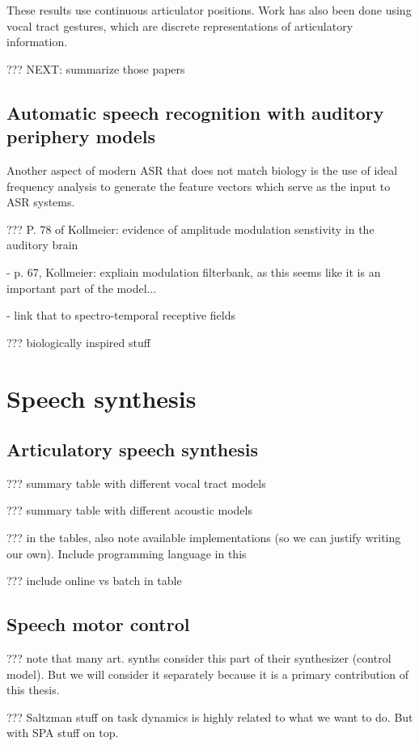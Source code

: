 These results
use continuous articulator positions.
Work has also been done using
vocal tract gestures,
which are discrete representations
of articulatory information.

??? NEXT: summarize those papers

\subsection{Automatic speech recognition with auditory periphery models}

Another aspect of modern ASR
that does not match biology
is the use of ideal frequency analysis
to generate the feature vectors
which serve as the input to ASR systems.

??? P. 78 of Kollmeier: evidence of amplitude modulation senstivity
in the auditory brain

- p. 67, Kollmeier: expliain modulation filterbank,
  as this seems like it is an important part of the model...

- link that to spectro-temporal receptive fields

??? biologically inspired stuff

\section{Speech synthesis}

\subsection{Articulatory speech synthesis}

??? summary table with different vocal tract models

??? summary table with different acoustic models

??? in the tables, also note available implementations
(so we can justify writing our own).
Include programming language in this

??? include online vs batch in table

\subsection{Speech motor control}

??? note that many art. synths consider this part of their
synthesizer (control model).
But we will consider it separately because
it is a primary contribution of this thesis.

??? Saltzman stuff on task dynamics
is highly related to what we want to do.
But with SPA stuff on top.

